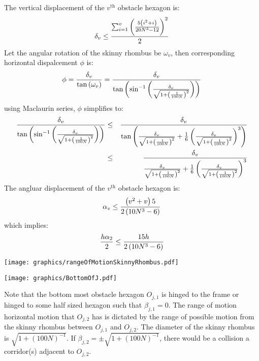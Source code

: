 The vertical displacement of the $v^\text{th}$ obstacle hexagon is:
$$\delta_v \leq \frac{\sum_{i=1}^v  \left(  \frac{5\left( i^2+i \right)}{20N^3-12} \right)^2}{2}$$
Let the angular rotation of the skinny rhombus be $\omega_v$, then corresponding horizontal dispalcement $\phi$ is:
$$\phi = \frac{\delta_v}{\tan\left( \omega_v \right)}=\frac{\delta_v}{\tan\left( \sin^{-1} \left( \frac{\delta_v}{\sqrt{1+ \left( \frac{1}{100N} \right)^2}} \right) \right)}$$
using Maclaurin series, $\phi$ simplifies to:
\begin{eqnarray*}
\frac{\delta_v}{\tan\left( \sin^{-1} \left( \frac{\delta_v}{\sqrt{1+ \left( \frac{1}{100N} \right)^2}} \right) \right)}&\leq&\frac{\delta_v}{\tan\left(  \frac{\delta_v}{\sqrt{1+ \left( \frac{1}{100N} \right)^2}}     + \frac{1}{6} \left( \frac{\delta_v}{\sqrt{1+ \left( \frac{1}{100N} \right)^2}} \right)^3 \right)}\\
&\leq& \frac{\delta_v}{ \frac{\delta_v}{\sqrt{1+ \left( \frac{1}{100N} \right)^2}}     + \frac{1}{6} \left( \frac{\delta_v}{\sqrt{1+ \left( \frac{1}{100N} \right)^2}} \right)^3}
\end{eqnarray*}
The angluar displacement of the $v^\text{th}$ obstacle hexagon is:
$$\alpha_v \leq \frac{\left( v^2 + v \right)5}{2\left( 10N^3-6 \right)}$$
which implies:
$$\frac{h\alpha_2 }{2} \leq \frac{15h}{2\left( 10N^3-6 \right)}$$



\begin{minipage}{\linewidth}
\begin{center}
\texttt{[image: graphics/rangeOfMotionSkinnyRhombus.pdf]}
\label{fig:rangeOfMotionSkinnyRhombus.pdf}
\end{center}
\end{minipage}

\begin{minipage}{\linewidth}
\begin{center}
\texttt{[image: graphics/BottomOfJ.pdf]}
\label{fig:BottomOfJ.pdf}
\end{center}
\end{minipage}

Note that the bottom most obstacle hexagon $O_{j,1}$ is hinged to the frame or hinged to some half sized hexagon such that $\beta_{j,1} = 0$.  
The range of motion horizontal motion that $O_{j,2}$ has is dictated by the range of possible motion from the skinny rhombus between $O_{j,1}$ and $O_{j,2}$.
The diameter of the skinny rhombus is $\sqrt{1+(100N)^{-1}}$.  
If $\beta_{j,2} = \pm \sqrt{1+(100N)^{-1}}$, there would be a collision a  corridor(s) adjacent to $O_{j,2}$.  


